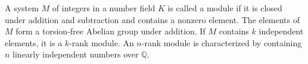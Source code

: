 A system $M$ of integers in a number field $K$ is called a module if it is closed under addition and subtraction and contains a nonzero element. The elements of $M$ form a torsion-free Abelian group under addition. If $M$ contains $k$ independent elements, it is a $k$-rank module. An $n$-rank module is characterized by containing $n$ linearly independent numbers over $\mathbb{Q}$.
